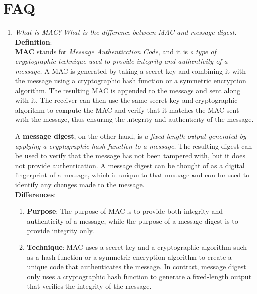 \documentclass[11pt]{article}
\begin{document}
\clearpage

\section{FAQ}

\begin{enumerate}
    \item \textit{What is MAC? What is the difference between MAC and message digest.} \\

          \textbf{\textbf{Definition}}: \\

          \textbf{MAC} stands for \textit{Message Authentication Code}, and it is \textit{a type of cryptographic technique used to provide integrity and authenticity of a message.} A MAC is generated by taking a secret key and combining it with the message using a cryptographic hash function or a symmetric encryption algorithm. The resulting MAC is appended to the message and sent along with it. The receiver can then use the same secret key and cryptographic algorithm to compute the MAC and verify that it matches the MAC sent with the message, thus ensuring the integrity and authenticity of the message.

          A \textbf{message digest}, on the other hand, is \textit{a fixed-length output generated by applying a cryptographic hash function to a message.} The resulting digest can be used to verify that the message has not been tampered with, but it does not provide authentication. A message digest can be thought of as a digital fingerprint of a message, which is unique to that message and can be used to identify any changes made to the message.\\


          \textbf{Differences}:\\

          \begin{enumerate}
              \item \textbf{Purpose}: The purpose of MAC is to provide both integrity and authenticity of a message, while the purpose of a message digest is to provide integrity only.

              \item \textbf{Technique}: MAC uses a secret key and a cryptographic algorithm such as a hash function or a symmetric encryption algorithm to create a unique code that authenticates the message. In contrast, message digest only uses a cryptographic hash function to generate a fixed-length output that verifies the integrity of the message.


\end{enumerate}
\end{enumerate}
\end{document}
